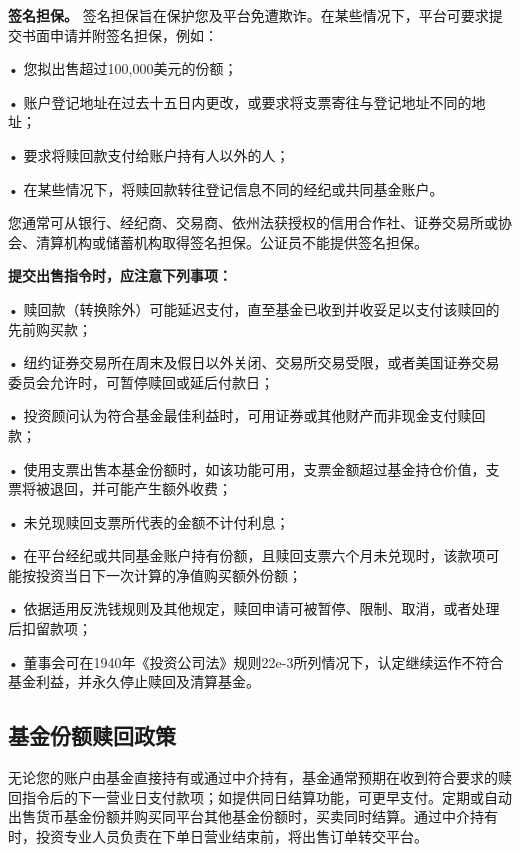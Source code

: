 \documentclass[UTF8,fontset=none,11pt,a4paper]{ctexart}
\begin{document}
\textbf{签名担保。} 签名担保旨在保护您及平台免遭欺诈。在某些情况下，平台可要求提交书面申请并附签名担保，例如：


• 您拟出售超过100,000美\allowbreak\mbox{元的份额；}


• 账户登记地址在过去十五日内更改，或要求将支票寄往与登记地址不\allowbreak\mbox{同的地址；}


• 要求将赎回款支付给账户持有人\allowbreak\mbox{以外的人；}


• 在某些情况下，将赎回款转往登记信息不同的经纪或共同\allowbreak\mbox{基金账户。}


您通常可从银行、经纪商、交易商、依州法获授权的信用合作社、证券交易所或协会、清算机构或储蓄机构取得签名担保。公证员不能提供\allowbreak\mbox{签名担保。}


\textbf{提交出售指令时，应注意下列事项：}


• 赎回款（转换除外）可能延迟支付，直至基金已收到并收妥足以支付该赎回的先\allowbreak\mbox{前购买款；}


• 纽约证券交易所在周末及假日以外关闭、交易所交易受限，或者美国证券交易委员会允许时，可暂停赎回或延\allowbreak\mbox{后付款日；}


• 投资顾问认为符合基金最佳利益时，可用证券或其他财产而非现金支\allowbreak\mbox{付赎回款；}


• 使用支票出售本基金份额时，如该功能可用，支票金额超过基金持仓价值，支票将被退回，并可能产生\allowbreak\mbox{额外收费；}


• 未兑现赎回支票所代表的金额不\allowbreak\mbox{计付利息；}


• 在平台经纪或共同基金账户持有份额，且赎回支票六个月未兑现时，该款项可能按投资当日下一次计算的净值购买\allowbreak\mbox{额外份额；}


• 依据适用反洗钱规则及其他规定，赎回申请可被暂停、限制、取消，或者处理后\allowbreak\mbox{扣留款项；}


• 董事会可在1940年《投资公司法》规则22e-3所列情况下，认定继续运作不符合基金利益，并永久停止赎回及\allowbreak\mbox{清算基金。}


\subsection*{基金份额赎回政策}
无论您的账户由基金直接持有或通过中介持有，基金通常预期在收到符合要求的赎回指令后的下一营业日支付款项；如提供同日结算功能，可更早支付。定期或自动出售货币基金份额并购买同平台其他基金份额时，买卖同时结算。通过中介持有时，投资专业人员负责在下单日营业结束前，将出售订单\allowbreak\mbox{转交平台。}
\end{document}
